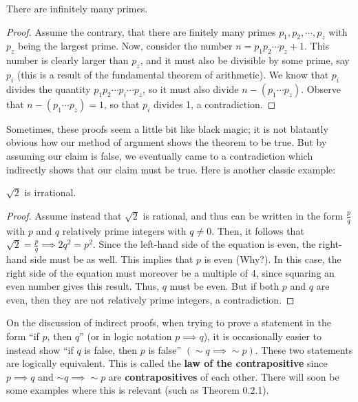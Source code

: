 \begin{theorem}
    There are infinitely many primes.
\end{theorem}

\begin{proof}
    Assume the contrary, that there are finitely many primes $p_1, p_2, \cdots, p_z$ with $p_z$ being the largest prime. Now, consider the number $n=p_1p_2\cdots p_z +1$. This number is clearly larger than $p_z$, and it must also be divisible by some prime, say $p_i$ (this is a result of the fundamental theorem of arithmetic). We know that $p_i$ divides the quantity $p_1p_2\cdots p_i\cdots p_z$, so it must also divide $n-(p_1\cdots p_z)$. Observe that $n-(p_1\cdots p_z)=1$, so that $p_i$ divides 1, a contradiction.  
\end{proof}

Sometimes, these proofs seem a little bit like black magic; it is not blatantly obvious how our method of argument shows the theorem to be true. But by assuming our claim is false, we eventually came to a contradiction which indirectly shows that our claim must be true. Here is another classic example:

\begin{theorem}
    $\sqrt{2}$ is irrational.
\end{theorem}

\begin{proof}
    Assume instead that $\sqrt{2}$ is rational, and thus can be written in the form $\frac{p}{q}$ with $p$ and $q$ relatively prime integers with $q\neq 0$. Then, it follows that $\sqrt{2}=\frac{p}{q}\implies 2q^2=p^2$. Since the left-hand side of the equation is even, the right-hand side must be as well. This implies that $p$ is even (Why?). In this case, the right side of the equation must moreover be a multiple of 4, since squaring an even number gives this result. Thus, $q$ must be even. But if both $p$ and $q$ are even, then they are not relatively prime integers, a contradiction. 
\end{proof}

On the discussion of indirect proofs, when trying to prove a statement in the form ``if $p$, then $q$'' (or in logic notation $p\implies q$), it is occasionally easier to instead show ``if $q$ is false, then $p$ is false'' $(\sim q\implies \sim p)$. These two statements are logically equivalent. This is called the \textbf{law of the contrapositive} since $p\implies q$ and $\sim q \implies \sim p$ are \textbf{contrapositives} of each other. There will soon be some examples where this is relevant (such as Theorem 0.2.1). \par

